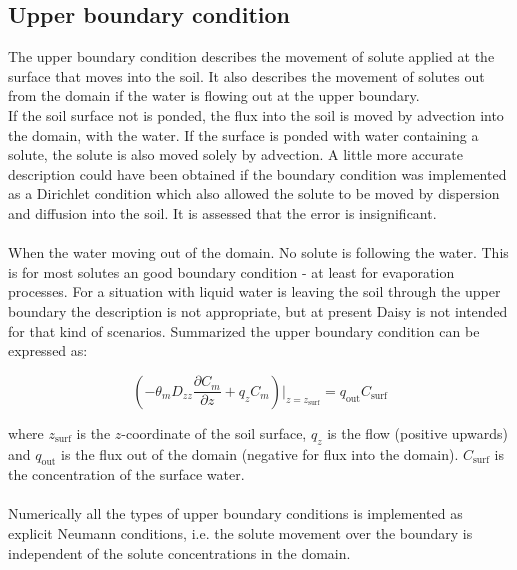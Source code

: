 \documentclass{report}
\begin{document}
\subsection{Upper boundary condition}


The upper boundary condition describes the movement of solute
applied at the surface that moves into the soil. It also describes the
movement of solutes out from the domain if the water is flowing
out at the upper boundary.\\

If the soil surface not is ponded, the flux into the soil is moved by
advection into the domain, with the water. If the surface is ponded
with water containing a solute, the solute is also moved solely by
advection. A little more accurate description could have been
obtained if the boundary condition was implemented as a Dirichlet
condition which also allowed the solute to be moved by dispersion
and diffusion into the soil. It is assessed that the error is
insignificant.\\
\\
When the water moving out of the domain. No solute is following
the water. This is for most solutes an good boundary condition - at
least for evaporation processes. For a situation with liquid water is
leaving the soil through the upper boundary the description is not
appropriate, but at present Daisy is not intended for that kind of
scenarios. Summarized the upper boundary condition can be
expressed as:
%
%

\begin{equation}
\left(-\theta_m D_{zz} \frac{\partial C_m}{\partial z}+q_zC_m
\right) \bigg \vert_{z=z_{\text{surf}}} =
q_{\text{out}}C_{\text{surf}}
\end{equation}


where $z_{\text{surf}}$ is the $z$-coordinate of the soil surface,
$q_z$ is the flow (positive upwards) and $q_{\text{out}}$ is the
flux out of the domain (negative for flux into the domain).
$C_{\text{surf}}$ is the concentration of the surface water. \\
\\
Numerically all the types of upper boundary conditions is
implemented as explicit Neumann conditions, i.e. the solute
movement over the boundary is independent of the solute
concentrations in the domain.
\end{document}
